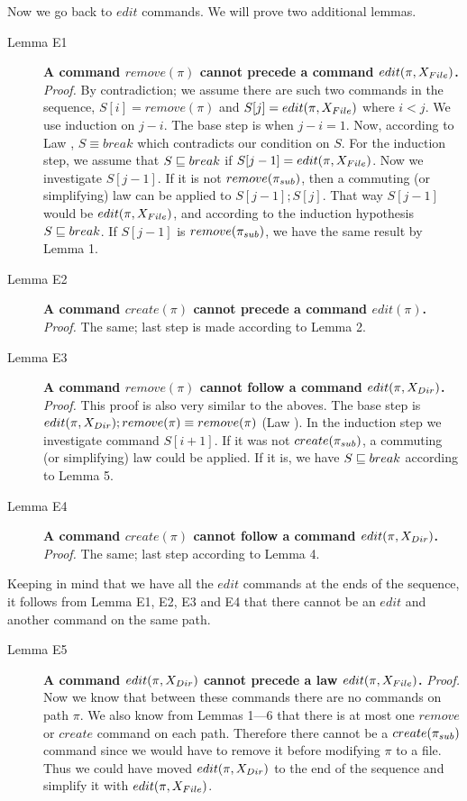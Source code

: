 
Now we go back to \(edit\) commands. We will prove two additional lemmas.
\begin{description}
\item[Lemma E1] {\bf A command \(remove(\pi)\) cannot precede a command
\(edit(\pi,X_{File})\).} \emph{Proof.} 
By contradiction; we assume there are such two commands in the sequence,
\(S[i]=remove(\pi)\) and \(S[j]=edit(\pi,X_{File})\) where \(i<j\). We
use induction on \(j-i\). The base
step is when \(j-i=1\). Now, according to Law \lawxviii, \(S\equiv
break\) which contradicts our condition on \(S\).
For the induction step, we assume that \(S\sqsubseteq break\) if
\(S[j-1]=edit(\pi,X_{File})\). Now we investigate \(S[j-1]\). If it is
not \(remove(\pi_{sub})\), then a commuting (or simplifying) law can be
applied to \(S[j-1];S[j]\). That way
\(S[j-1]\) would be \(edit(\pi,X_{File})\), and according to the
induction hypothesis \(S\sqsubseteq break\). If \(S[j-1]\) is
\(remove(\pi_{sub})\), we have the same result by Lemma 1.

\item[Lemma E2] {\bf A command \(create(\pi)\) cannot precede a command 
\(edit(\pi)\).} 
\emph{Proof.} The same; last step is made according to
Lemma 2.

\item[Lemma E3] {\bf A command \(remove(\pi)\) cannot follow a
command \(edit(\pi,X_{Dir})\).} 
\emph{Proof.} 
This proof is also very similar to the aboves. The base step is 
\(edit(\pi,X_{Dir}); remove(\pi)\equiv remove(\pi)\) (Law \lawxxv). In the
induction step we investigate command \(S[i+1]\). If it was not
\(create(\pi_{sub})\), a commuting (or simplifying) law could be applied. If
it is, we have \(S\sqsubseteq break\) according to Lemma 5.

\item[Lemma E4] {\bf A command \(create(\pi)\) cannot follow a
command \(edit(\pi,X_{Dir})\).} 
\emph{Proof.} The same; last step
according to Lemma 4.
\end{description}

\noindent
Keeping in mind that we have all the \(edit\) commands at the ends of the
sequence, it follows from Lemma E1, E2, E3 and E4 that there cannot be an
\(edit\) and another command on the same path.

\begin{description}
\item[Lemma E5] {\bf A command \(edit(\pi,X_{Dir})\) cannot precede a law
\(edit(\pi,X_{File})\).} \emph{Proof.} Now we know that between these
commands there are no commands on path \(\pi\). We also know from Lemmas
1---6 that there is at most one \(remove\) or \(create\) command on each
path. Therefore
there cannot be a \(create(\pi_{sub})\) command since we would have to
remove it before modifying \(\pi\) to a file.
Thus we could have moved \(edit(\pi,X_{Dir})\) to the end of the sequence
and simplify it with \(edit(\pi,X_{File})\).
\end{description}

